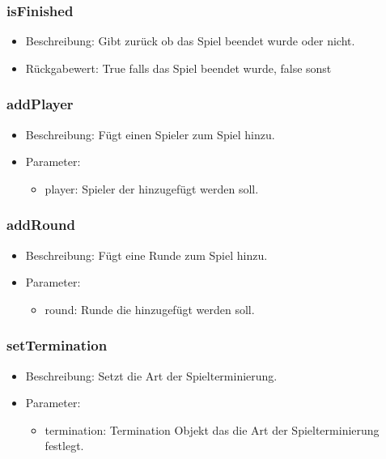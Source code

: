 \documentclass[a4paper]{scrreprt}
\begin{document}
	\subsubsection{isFinished}
	\begin{itemize}
		\item Beschreibung: Gibt zurück ob das Spiel beendet wurde oder nicht.
		\item Rückgabewert: True falls das Spiel beendet wurde, false sonst
	\end{itemize}
	
	\subsubsection{addPlayer}
	\begin{itemize}
		\item Beschreibung: Fügt einen Spieler zum Spiel hinzu.
		\item Parameter:
		\begin{itemize}
			\item player: Spieler der hinzugefügt werden soll.
		\end{itemize}
	\end{itemize}
	
	\subsubsection{addRound}
	\begin{itemize}
		\item Beschreibung: Fügt eine Runde zum Spiel hinzu.
		\item Parameter:
		\begin{itemize}
			\item round: Runde die hinzugefügt werden soll.
		\end{itemize}
	\end{itemize}
	
	\subsubsection{setTermination}
	\begin{itemize}
		\item Beschreibung: Setzt die Art der Spielterminierung.
		\item Parameter:
		\begin{itemize}
			\item termination: Termination Objekt das die Art der Spielterminierung festlegt.
		\end{itemize}
	\end{itemize}
	
\end{document}
